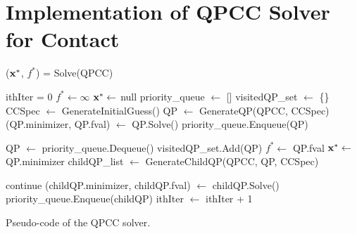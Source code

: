 \section{Implementation of QPCC Solver for Contact}

\begin{algorithm}[ht]
($\mathbf{x}^*$, $f^*$) = Solve(QPCC)\\
\Begin
{
    ithIter = 0\;
    $f^* \leftarrow \infty$\;
    $\mathbf{x}^* \leftarrow$ null\;
    priority\_queue $\leftarrow$ []\;
    visitedQP\_set $\leftarrow$ \{\}\;
    CCSpec $\leftarrow$ GenerateInitialGuess()\;
    QP $\leftarrow$ GenerateQP(QPCC, CCSpec)\;
    (QP.minimizer, QP.fval) $\leftarrow$ QP.Solve()\;
    priority\_queue.Enqueue(QP)\;

    {
        QP $\leftarrow$ priority\_queue.Dequeue()\;
        visitedQP\_set.Add(QP)\;
        {
            $f^* \leftarrow$ QP.fval\;
            $\mathbf{x}^* \leftarrow$ QP.minimizer\;
        }
        childQP\_list $\leftarrow$ GenerateChildQP(QPCC, QP, CCSpec)\;

        {
            {
                continue\;
            }
            (childQP.minimizer, childQP.fval) $\leftarrow$ childQP.Solve()\;
            priority\_queue.Enqueue(childQP)\;
        }
        ithIter $\leftarrow$ ithIter + 1\;
    }
    \;
}
\caption{Pseudo-code of the QPCC solver.} \label{alg:main}
\end{algorithm}


